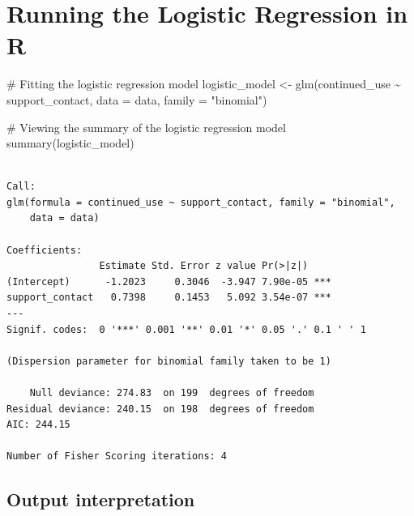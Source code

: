 \documentclass[
  letterpaper,
  DIV=11,
  numbers=noendperiod]{scrreprt}
\newenvironment{Shaded}{\begin{snugshade}}{\end{snugshade}}
\newcommand{\AttributeTok}[1]{\textcolor[rgb]{0.40,0.45,0.13}{#1}}
\newcommand{\CommentTok}[1]{\textcolor[rgb]{0.37,0.37,0.37}{#1}}
\newcommand{\FunctionTok}[1]{\textcolor[rgb]{0.28,0.35,0.67}{#1}}
\newcommand{\NormalTok}[1]{\textcolor[rgb]{0.00,0.23,0.31}{#1}}
\newcommand{\OtherTok}[1]{\textcolor[rgb]{0.00,0.23,0.31}{#1}}
\newcommand{\SpecialCharTok}[1]{\textcolor[rgb]{0.37,0.37,0.37}{#1}}
\newcommand{\StringTok}[1]{\textcolor[rgb]{0.13,0.47,0.30}{#1}}
\begin{document}
\section{Running the Logistic Regression in
R}\label{running-the-logistic-regression-in-r}

\begin{Shaded}
\begin{Highlighting}[]
\CommentTok{\# Fitting the logistic regression model}
\NormalTok{logistic\_model }\OtherTok{\textless{}{-}} \FunctionTok{glm}\NormalTok{(continued\_use }\SpecialCharTok{\textasciitilde{}}\NormalTok{ support\_contact, }\AttributeTok{data =}\NormalTok{ data, }\AttributeTok{family =} \StringTok{"binomial"}\NormalTok{)}

\CommentTok{\# Viewing the summary of the logistic regression model}
\FunctionTok{summary}\NormalTok{(logistic\_model)}
\end{Highlighting}
\end{Shaded}

\begin{verbatim}

Call:
glm(formula = continued_use ~ support_contact, family = "binomial", 
    data = data)

Coefficients:
                Estimate Std. Error z value Pr(>|z|)    
(Intercept)      -1.2023     0.3046  -3.947 7.90e-05 ***
support_contact   0.7398     0.1453   5.092 3.54e-07 ***
---
Signif. codes:  0 '***' 0.001 '**' 0.01 '*' 0.05 '.' 0.1 ' ' 1

(Dispersion parameter for binomial family taken to be 1)

    Null deviance: 274.83  on 199  degrees of freedom
Residual deviance: 240.15  on 198  degrees of freedom
AIC: 244.15

Number of Fisher Scoring iterations: 4
\end{verbatim}

\subsection{Output interpretation}\label{output-interpretation}
\end{document}
